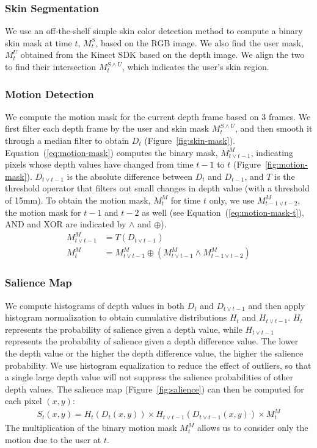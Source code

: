 \documentclass{sig-alternate-2013}
\begin{document}
\subsubsection{Skin Segmentation}
We use an off-the-shelf simple skin color detection method to compute a binary skin mask at
time $t$, $M_t^S$, based on the RGB image. We also find the user mask, $M_t^U$ obtained from the Kinect SDK based on the depth image. 
We align the two to find their intersection $M_t^{S\wedge U}$, which indicates the user's skin region.

\subsubsection{Motion Detection}
We compute the motion mask for the current depth frame based on 3 frames. We first filter each 
depth frame by the user and skin mask $M_t^{S\wedge U}$, and then
smooth it through a median filter to obtain $D_t$ (Figure~\ref{fig:skin-mask}).
Equation~(\ref{eq:motion-mask}) computes the binary mask, $M_{t\vee t-1}^M$, 
indicating pixels whose depth values have changed from time $t-1$ to $t$ (Figure~\ref{fig:motion-mask}).
$D_{t\vee t-1}$ is the absolute difference between $D_t$ and $D_{t-1}$, and $T$ is the threshold operator that filters out small changes in depth value 
(with a threshold of 15mm). 
To obtain the motion mask, $M_{t}^M$ for time $t$ only, we use $M_{t-1\vee t-2}^M$, the motion mask for $t-1$ and $t-2$ as well (see Equation~(\ref{eq:motion-mask-t}),
 AND and XOR are indicated by $\wedge$ and $\oplus$).
\begin{align}
M_{t\vee t-1}^M &= T(D_{t\vee t-1}) \label{eq:motion-mask} \\
M_{t}^M &= M_{t\vee t-1}^M \oplus (M_{t\vee t-1}^M \wedge M_{t-1\vee t-2}^M) \label{eq:motion-mask-t}
\end{align}

\subsubsection{Salience Map}
We compute histograms of depth values in both $D_t$ and $D_{t\vee t-1}$ and then apply histogram normalization to obtain cumulative distributions $H_t$ and $H_{t\vee t-1}$.
$H_t$ represents the probability of salience given a depth value, while $H_{t\vee t-1}$ represents the probability of salience given
a depth difference value. The lower the depth value or the higher the depth difference value, the higher the salience probability. We use
histogram equalization to reduce the effect of outliers, so that a single large depth value will not suppress the salience probabilities of other depth values. 
The salience map (Figure~\ref{fig:salience}) can then be computed for each pixel $(x, y)$:
\begin{align*}
S_t(x, y) = H_t(D_t(x, y)) \times H_{t\vee t-1}(D_{t\vee t-1}(x, y)) \times M_t^M
\end{align*}
The multiplication of the binary motion mask $M_t^M$ allows us to consider only the motion due to the user at $t$.
 
\end{document}
